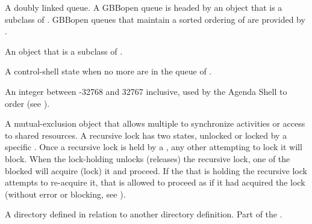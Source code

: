 \begin{glossary-list}
\glent[queue]
%
%
A doubly linked queue.  A GBBopen queue is headed by an object that is a
subclass of \textbf{}.  GBBopen queues that maintain a
sorted ordering of  are provided by
.


%
%
%
An object that is a subclass of \textbf{}.


\glent[quiescence]
%
%
A control-shell state when no more  are in the queue of
.


\glent[rating]
%
An integer between -32768 and 32767 inclusive, used by the Agenda Shell to
order  (see \textbf{}).


%
%
%
%
%
A mutual-exclusion object that allows multiple  to synchronize
activities or access to shared resources. A recursive lock has two states,
unlocked or locked by a specific . Once a recursive lock is held
by a , any other  attempting to lock it will
block. When the lock-holding  unlocks (releases) the recursive
lock, one of the blocked  will acquire (lock) it and proceed.
If the  that is holding the recursive lock attempts to
re-acquire it, that  is allowed to proceed as if it had acquired
the lock (without error or blocking, see ).


%
%
%
%
%
A directory defined in relation to another directory definition.
Part of the .


\end{glossary-list}
